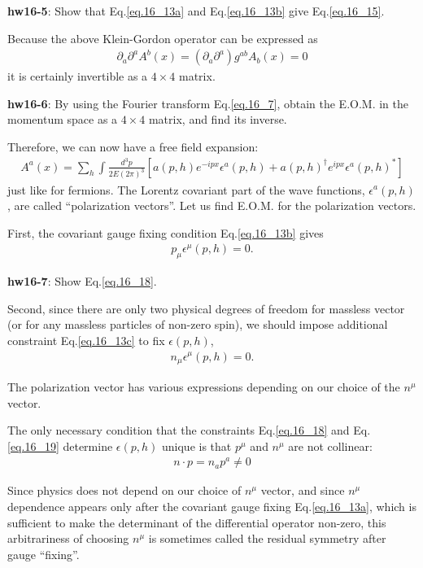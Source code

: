 \documentclass[12pt]{article}
\def\del{{\partial}}
\def\dgr{\dagger}
\begin{document}
{\bf hw16-5}:  Show that Eq.\ref{eq.16_13a} and Eq.\ref{eq.16_13b} give Eq.\ref{eq.16_15}.

Because the above Klein-Gordon operator can be expressed as
\begin{eqnarray}
  \del_a \del^a A^b(x) = (\del_a \del^a) g^{ab} A_b(x) = 0 \label{eq.16_16}
\end{eqnarray}
it is certainly invertible as a $4\times 4$ matrix.

{\bf hw16-6}: By using the Fourier transform Eq.\ref{eq.16_7}, obtain the E.O.M. in the momentum space as a $4\times 4$ matrix, and find its inverse.

Therefore, we can now have a free field expansion:
\begin{eqnarray}
  A^a(x) = \sum_h \int \frac{d^3p}{2E(2\pi)^3}
  [a(p,h) e^{-ipx} \epsilon^a(p,h) + a(p,h)^\dgr e^{ipx} \epsilon^a(p,h)^* ] \label{eq.16_17}
\end{eqnarray}
just like for fermions. The Lorentz covariant part of the wave
functions, $\epsilon^a(p,h)$, are called ``polarization vectors''.
Let us find E.O.M. for the polarization vectors.

First, the covariant gauge fixing condition Eq.\ref{eq.16_13b} gives
\begin{eqnarray}
  p_\mu \epsilon^\mu(p,h) = 0. \label{eq.16_18}
\end{eqnarray}

{\bf hw16-7}: Show Eq.\ref{eq.16_18}.

Second, since there are only two physical degrees of freedom for
massless vector (or for any massless particles of non-zero spin),
we should impose additional constraint Eq.\ref{eq.16_13c} to fix $\epsilon(p,h)$,
\begin{eqnarray}
  n_\mu \epsilon^\mu(p,h) = 0. \label{eq.16_19}
\end{eqnarray}

The polarization vector has various expressions depending on our
choice of the $n^\mu$ vector.

The only necessary condition that the constraints Eq.\ref{eq.16_18} and Eq.\ref{eq.16_19} determine $\epsilon(p,h)$ unique is that $p^\mu$ and $n^\mu$ are not collinear:
\begin{eqnarray} 
  n\cdot p = n_a p^a \neq 0 \label{eq.16_20}
\end{eqnarray}

Since physics does not depend on our choice of $n^\mu$ vector, and
since $n^\mu$ dependence appears only after the covariant gauge
fixing Eq.\ref{eq.16_13a}, which is sufficient to make the determinant of the
differential operator non-zero, this arbitrariness of choosing
$n^\mu$ is sometimes called the residual symmetry after gauge ``fixing''.
\end{document}
